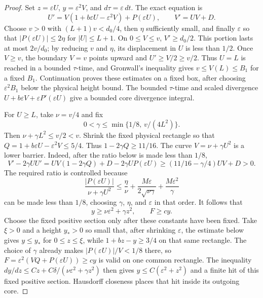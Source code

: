 \begin{proof}
Set $z=\varepsilon U$, $y=\varepsilon^2V$, and
$d\tau=\varepsilon\,dt$. The exact equation is
\begin{equation}\label{eq:forcing-core}
 U'=V(1+b\varepsilon U-\varepsilon^2V)+P(\varepsilon U),
 \qquad V'=UV+D.
\end{equation}
Choose $v>0$ with $(L+1)v<d_0/4$, then $\eta$ sufficiently
small, and finally $\varepsilon$ so that $|P(\varepsilon U)|\le2\eta$
for $|U|\le L+1$. On $0\le V\le v$, $V'\ge d_0/2$.
This portion lasts at most $2v/d_0$; by reducing $v$ and $\eta$,
its displacement in $U$ is less than $1/2$. Once $V\ge v$,
the boundary $V=v$ points upward and $U'\ge V/2\ge v/2$.
Thus $U=L$ is reached in a bounded $\tau$-time, and Gronwall's
inequality gives $v\le V(L)\le B_1$ for a fixed $B_1$.
Continuation proves these estimates on a fixed box, after choosing
$\varepsilon^2B_1$ below the physical height bound. The bounded
$\tau$-time and scaled divergence
$U+b\varepsilon V+\varepsilon P'(\varepsilon U)$ give a bounded core
divergence integral.

For $U\ge L$, take $\nu=v/4$ and fix
\[
 0<\gamma\le\min\{1/8,\,v/(4L^2)\}.
\]
Then $\nu+\gamma L^2\le v/2<v$. Shrink the fixed physical
rectangle so that $Q=1+b\varepsilon U-\varepsilon^2V\le5/4$.
Thus $1-2\gamma Q\ge11/16$. The curve $V=\nu+\gamma U^2$
is a lower barrier. Indeed, after the ratio below is made less than
$1/8$,
\[
 V'-2\gamma UU'
 =UV(1-2\gamma Q)+D-2\gamma UP(\varepsilon U)
 \ge(11/16-\gamma/4)UV+D>0.
\]
The required ratio is controlled because
\[
 \frac{|P(\varepsilon U)|}{\nu+\gamma U^2}
 \le\frac\eta\nu+\frac{M\varepsilon}{2\sqrt{\nu\gamma}}
                              +\frac{M\varepsilon^2}\gamma
\]
can be made less than $1/8$, choosing $\gamma$, $\eta$, and
$\varepsilon$ in that order. It follows that
\begin{equation}\label{eq:forcing-positive-parabola}
 y\ge\nu\varepsilon^2+\gamma z^2,\qquad F\ge cy.
\end{equation}
Choose the fixed positive section only after these constants have been
fixed. Take $\xi>0$ and a height $y_*>0$ so small that, after shrinking
$\varepsilon$, the estimate below gives $y\le y_*$ for
$0\le z\le\xi$, while $1+bz-y\ge3/4$ on that same rectangle. The
choice of $\gamma$ already makes $|P(\varepsilon U)|/V<1/8$ there, so
$F=\varepsilon^2(VQ+P(\varepsilon U))\ge c y$ is valid on one common
rectangle. The inequality
$dy/dz\le Cz+C\delta/(\nu\varepsilon^2+\gamma z^2)$ then gives
$y\le C(\varepsilon^2+z^2)$ and a finite hit of this fixed positive
section. Hausdorff closeness places that hit inside its outgoing core.


\end{proof}
